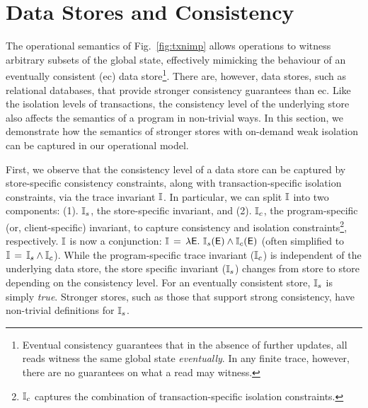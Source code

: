 \section{Data Stores and Consistency}
\label{sec:store-consistency}

The operational semantics of Fig.~\ref{fig:txnimp} allows operations
to witness arbitrary subsets of the global state, effectively mimicking the
behaviour of an eventually consistent ({\sc ec}) data
store\footnote{Eventual consistency guarantees that in the absence of further
  updates, all reads witness the same global state
  \emph{eventually}. In any finite trace, however, there are no
  guarantees on what a read may witness.}. There are, however, data stores,
such as relational databases, that provide stronger consistency
guarantees than {\sc ec}. Like the isolation levels of transactions,
the consistency level of the underlying store also affects the
semantics of a program in non-trivial ways. In this section, we
demonstrate how the semantics of stronger stores with on-demand weak
isolation can be captured in our operational model. 


First, we observe that the consistency level of a data store can be
captured by store-specific consistency constraints, along with
transaction-specific isolation constraints, via the trace invariant
$\mathbb{I}$. In particular, we can split $\mathbb{I}$ into two components: (1).
$\mathbb{I}_s$, the store-specific invariant, and (2). $\mathbb{I}_c$, the
program-specific (or, client-specific) invariant, to capture
consistency and isolation constraints\footnote{$\mathbb{I}_c$ captures the
combination of transaction-specific isolation constraints.},
respectively.  $\mathbb{I}$ is now a conjunction: $\mathbb{I} \,=\,
\lambda\textsf{E}.~\mathbb{I}_s(\textsf{E}) \wedge \mathbb{I}_c(\textsf{E})$ (often simplified to $\mathbb{I} \,=\,
\mathbb{I}_s\wedge\mathbb{I}_c$). While the program-specific trace invariant ($\mathbb{I}_c$)
is independent of the underlying data store, the store specific
invariant ($\mathbb{I}_s$) changes from store to store depending on the
consistency level.  For an eventually consistent store, $\mathbb{I}_s$ is
simply \emph{true}. Stronger stores, such as those that support strong
consistency, have non-trivial definitions for $\mathbb{I}_s$.

